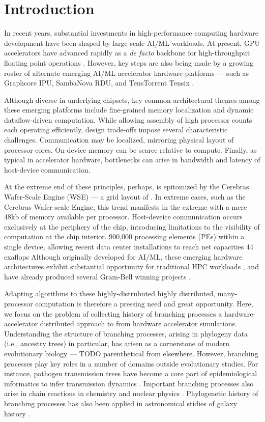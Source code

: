 \section{Introduction} \label{sec:introduction}

In recent years, substantial investments in high-performance computing hardware development have been shaped by large-scale AI/ML workloads.
At present, GPU accelerators have advanced rapidly as a \textit{de facto} backbone for high-throughput floating point operations \citep{unat2024landscape}.
However, key steps are also being made by a growing roster of alternate emerging AI/ML accelerator hardware platforms --- such as Graphcore IPU, SambaNova RDU, and TensTorrent Tensix \citep{lauterbach2021path,jia2019dissecting}.

Although diverse in underlying chipsets, key common architectural themes among these emerging platforms include fine-grained memory localization and dynamic dataflow-driven computation.
While allowing assembly of high processor counts each operating efficiently, design trade-offs impose several characteristic challenges.
Communication may be localized, mirroring physical layout of processor cores.
On-device memory can be scarce relative to compute.
Finally, as typical in accelerator hardware, bottlenecks can arise in bandwidth and latency of host-device communication.

At the extreme end of these principles, perhaps, is epitomized by the Cerebras Wafer-Scale Engine (WSE) --- a grid layout of .
In extreme cases, such as the Cerebras Wafer-scale Engine, this trend manifests in the extreme with a mere 48kb of memory available per processor.
Host-deveice communication occurs exclusively at the periphery of the chip, introducing limitations to the visibility of computation at the chip interior.
900,000 processing elements (PEs) within a single device, allowing recent data center installations to reach net capacities 44 exaflops \citep{Feldman2025CerebrasOKC}
Although originally developed for AI/ML, these emerging hardware architectures exhibit substantial opportunity for traditional HPC workloads \citep{TODO}, and have already produced several Gram-Bell winning projects \citep{TODO}.

Adapting algorithms to these highly-distrubuted highly distributed, many-processor computation is therefore a pressing need and great opportunity.
Here, we focus on the problem of collecting history of branching processes a hardware-accelerator distributed approach to from hardware accelerator simulations.
Understanding the structure of branching processes, arising in phylogeny data (i.e., ancestry trees) in particular, has arisen as a cornerstone of modern evolutionary biology --- TODO parenthetical from elsewhere.
However, branching processes play key roles in a number of domains outside evolutionary studies.
For instance, pathogen transmission trees have become a core part of epidemiological informatics to infer transmission dynamics \citep{TODO}.
Important branching processes also arise in chain reactions in chemistry and nuclear physics \citep{UsonFornies1999,Pazsit2007}.
Phylogenetic history of branching processes has also been applied in astronomical stidies of galaxy history \citep{Jofr2017}.


